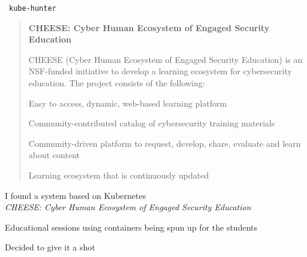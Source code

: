 \documentclass[Screen16to9,17pt]{foils}
\begin{document}





\faWrench\ \verb+kube-hunter+



\begin{quote}
{\bf CHEESE: Cyber Human Ecosystem of Engaged Security Education}

CHEESE (Cyber Human Ecosystem of Engaged Security Education) is an NSF-funded initiative to develop a learning ecosystem for cybersecurity education. The project consists of the following:

\begin{list2}
\item Easy to access, dynamic, web-based learning platform
\item Community-contributed catalog of cybersecurity training materials
\item Community-driven platform to request, develop, share, evaluate and learn about content
\item Learning ecosystem that is continuously updated
\end{list2}
\end{quote}

\begin{list2}
\item I found a system based on Kubernetes \\
\emph{CHEESE: Cyber Human Ecosystem of Engaged Security Education}\\
\item Educational sessions using containers being spun up for the students
\item Decided to give it a shot
\end{list2}



\end{document}
